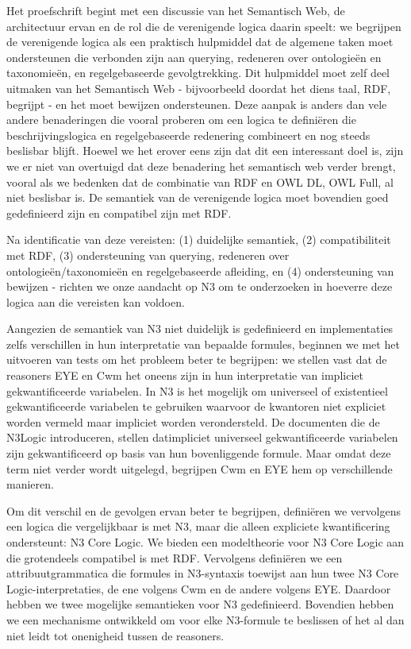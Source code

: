 Het proefschrift begint met een discussie van het Semantisch Web, de architectuur ervan en de rol
die de verenigende logica daarin speelt: we begrijpen de verenigende logica als een praktisch
hulpmiddel dat de algemene taken moet ondersteunen die verbonden zijn aan querying, redeneren
over ontologieën en taxonomieën, en regelgebaseerde gevolgtrekking. Dit hulpmiddel moet zelf deel
uitmaken van het Semantisch Web - bijvoorbeeld doordat het diens taal, RDF, begrijpt - en het moet
bewijzen ondersteunen. Deze aanpak is anders dan vele andere benaderingen die vooral
proberen om een logica te definiëren die beschrijvingslogica en regelgebaseerde redenering
combineert en nog steeds beslisbar blijft. Hoewel we het erover eens zijn dat dit een interessant
doel is, zijn we er niet van overtuigd dat deze benadering het semantisch web verder brengt, vooral
als we bedenken dat de combinatie van RDF en OWL DL, OWL Full, al niet beslisbar is. De semantiek
van de verenigende logica moet bovendien goed gedefinieerd zijn en compatibel zijn met RDF.

Na identificatie van deze vereisten: (1) duidelijke semantiek, (2) compatibiliteit met RDF, (3)
ondersteuning van querying, redeneren over ontologieën/taxonomieën en regelgebaseerde afleiding,
en (4) ondersteuning van bewijzen - richten we onze aandacht op N3 om te onderzoeken in hoeverre
deze logica aan die vereisten kan voldoen.

Aangezien de semantiek van N3 niet duidelijk is gedefinieerd en implementaties zelfs verschillen in
hun interpretatie van bepaalde formules, beginnen we met het uitvoeren van tests om het probleem beter
te begrijpen: we stellen vast dat de reasoners EYE en Cwm het oneens zijn in hun interpretatie van
impliciet gekwantificeerde variabelen. In N3 is het mogelijk om universeel of existentieel
gekwantificeerde variabelen te gebruiken waarvoor de kwantoren niet expliciet worden vermeld
maar impliciet worden verondersteld. De documenten die de N3Logic introduceren, stellen datimpliciet universeel gekwantificeerde variabelen zijn gekwantificeerd op basis van hun
bovenliggende formule. Maar omdat deze term niet verder wordt uitgelegd, begrijpen Cwm en EYE
hem op verschillende manieren.

Om dit verschil en de gevolgen ervan beter te begrijpen, definiëren we vervolgens een logica die
vergelijkbaar is met N3, maar die alleen expliciete kwantificering ondersteunt: N3 Core Logic. We
bieden een modeltheorie voor N3 Core Logic aan die grotendeels compatibel is met RDF. Vervolgens
definiëren we een attribuutgrammatica die formules in N3-syntaxis toewijst aan hun twee N3 Core
Logic-interpretaties, de ene volgens Cwm en de andere volgens EYE. Daardoor hebben we twee
mogelijke semantieken voor N3 gedefinieerd. Bovendien hebben we een mechanisme ontwikkeld om
voor elke N3-formule te beslissen of het al dan niet leidt tot onenigheid tussen de reasoners.

